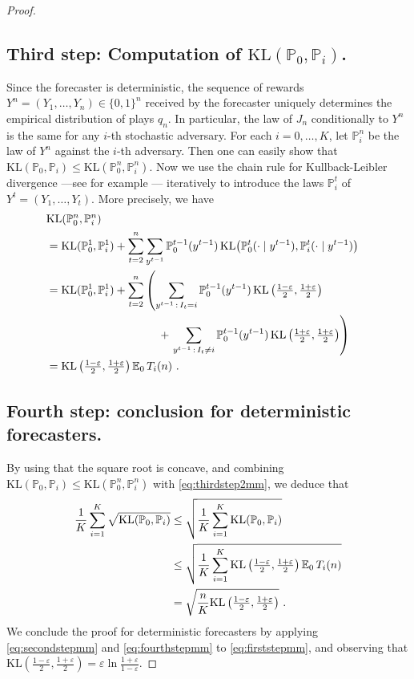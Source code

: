 \documentclass[11pt]{hackednow}
\newcommand{\K}{\mathrm{KL}}
\renewcommand{\P}{\mathbb{P}}
\newcommand{\E}{\mathbb{E}}
\renewcommand{\epsilon}{\varepsilon}
\begin{document}
\begin{proof}
\subsection*{Third step: Computation of $\K(\P_{0}, \P_{i})$.
}
Since the forecaster is deterministic, the sequence of rewards $Y^n = (Y_1,\hdots,Y_n) \in \{0,1\}^n$ received by the forecaster uniquely determines the empirical distribution of plays $q_n$. In particular, the law of $J_n$ conditionally to $Y^n$ is the same for any $i$-th stochastic adversary. For each $i=0, \hdots, K$, let $\P_i^n$ be the law of $Y^n$ against the $i$-th adversary. Then one can easily show that 
$
\K(\P_{0}, \P_{i}) \leq \K(\P_{0}^n, \P_{i}^n)
$.
Now we use the chain rule for Kullback-Leibler divergence ---see for example \cite[Section A.2]{CL06}--- iteratively to introduce the laws $\P^t_i$ of $Y^t=(Y_1, \hdots, Y_t)$. More precisely, we have
\begin{align}
\lefteqn{\K(\P_{0}^n, \P_{i}^n)} \notag \\
& = \K(\P_0^1, \P_i^1) + \sum_{t=2}^n \sum_{y^{t-1}} \P_0^{t-1}(y^{t-1})\,\K\bigl(\P_{0}^t(\cdot\mid y^{t-1}),\P_{i}^t(\cdot\mid y^{t-1})\bigr) \notag \\
& = \K(\P_0^1, \P_i^1) + \sum_{t=2}^n \left( \sum_{y^{t-1} \,:\, I_t = i} \P_0^{t-1}(y^{t-1})\,\K\left(\tfrac{1-\epsilon}{2},\tfrac{1+\epsilon}{2}\right) \right. \notag \\
&\qquad\qquad\qquad\qquad\qquad
+ \left. \sum_{y^{t-1} \,:\, I_t \neq i} \P_0^{t-1}(y^{t-1})\,\K\left(\tfrac{1+\epsilon}{2}, \tfrac{1+\epsilon}{2}\right)\right) \notag \\
& = \K\left(\tfrac{1-\epsilon}{2}, \tfrac{1+\epsilon}{2} \right) \E_0\,T_{i}(n)~. \label{eq:thirdstep2mm}
\end{align}
\subsection*{Fourth step: conclusion for deterministic forecasters.
}
By using that the square root is concave, and combining $\K(\P_{0}, \P_{i}) \leq \K(\P_{0}^n, \P_{i}^n)$ with \eqref{eq:thirdstep2mm}, we deduce that
\begin{align}
\frac{1}{K} \sum_{i=1}^K \sqrt{\K(\P_{0},\P_{i})}& \leq \sqrt{\frac{1}{K} \sum_{i=1}^K \K(\P_{0},\P_{i})} \notag \\
& \leq \sqrt{\frac{1}{K} \sum_{i=1}^K \K\left(\tfrac{1-\epsilon}{2}, \tfrac{1+\epsilon}{2} \right) \E_0\,T_{i}(n)} \notag \\
& = \sqrt{\frac{n}{K} \K\left(\tfrac{1-\epsilon}{2}, \tfrac{1+\epsilon}{2} \right)}~. \label{eq:fourthstepmm}
\end{align}
We conclude the proof for deterministic forecasters by applying \eqref{eq:secondstepmm} and \eqref{eq:fourthstepmm} to \eqref{eq:firststepmm}, and observing that
$
\K\left(\tfrac{1-\epsilon}{2}, \tfrac{1+\epsilon}{2} \right) = 
\epsilon \ln\tfrac{1+\epsilon}{1-\epsilon}
$.


\end{proof}
\end{document}
